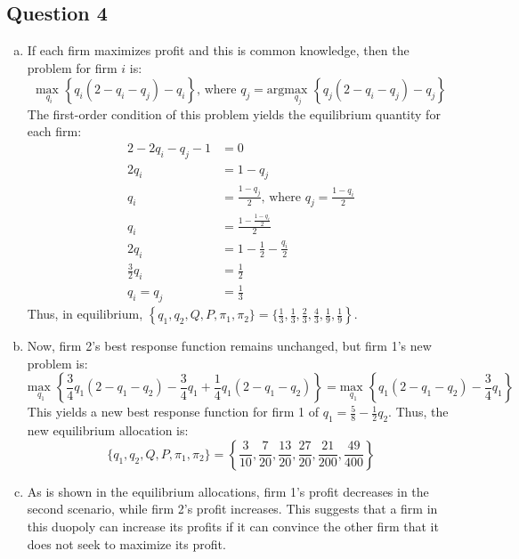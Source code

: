 \documentclass{article}
\newcommand{\usmax}[1]{\underset{#1}{\text{max }}}
\begin{document}
\pagebreak
\subsection*{Question 4}

\begin{enumerate}[(a)]
	\item If each firm maximizes profit and this is common knowledge, then the problem for firm $i$ is:
		\[
			\usmax{q_i}\left\{q_i\left(2-q_i-q_j\right) - q_i\right\}\text{, where }q_j = \text{arg}\usmax{q_j}\left\{q_j\left(2-q_i-q_j\right) - q_j\right\}
		\]
		The first-order condition of this problem yields the equilibrium quantity for each firm:
		\begin{align*}
			2-2q_i - q_j -1 &= 0	\\
			2q_i &= 1-q_j 	\\
			q_i &= \frac{1-q_j}{2}\text{, where } q_j = \frac{1-q_i}{2}	\\
			q_i &= \frac{1-\frac{1-q_i}{2}}{2} \\
			2q_i &= 1-\frac{1}{2}-\frac{q_i}{2}	\\
			\frac{3}{2}q_i &= \frac{1}{2}	\\
			q_i = q_j &= \frac{1}{3}
		\end{align*}
		Thus, in equilibrium, ${\left\{q_1,q_2,Q,P,\pi_1,\pi_2\}=\{\frac{1}{3},\frac{1}{3},\frac{2}{3},\frac{4}{3},\frac{1}{9},\frac{1}{9}\right\}}$.
	
	\item Now, firm 2's best response function remains unchanged, but firm 1's new problem is:
		\[
			\usmax{q_1}\left\{\frac{3}{4}q_1\left(2-q_1-q_2\right) - \frac{3}{4}q_1 + \frac{1}{4}q_1\left(2-q_1-q_2\right)\right\} =
			\usmax{q_1}\left\{q_1\left(2-q_1-q_2\right) - \frac{3}{4}q_1\right\}
		\]
		This yields a new best response function for firm 1 of ${q_1 = \frac{5}{8}-\frac{1}{2}q_2}$. Thus, the new equilibrium allocation is:
		\[
			\{q_1,q_2,Q,P,\pi_1,\pi_2\}=\left\{\frac{3}{10},\frac{7}{20},\frac{13}{20},\frac{27}{20},\frac{21}{200},\frac{49}{400}\right\}
		\]
	
	\item As is shown in the equilibrium allocations, firm 1's profit decreases in the second scenario, while firm 2's profit increases. This suggests that a firm in this duopoly can increase its profits if it can convince the other firm that it does not seek to maximize its profit.
\end{enumerate}
\end{document}

